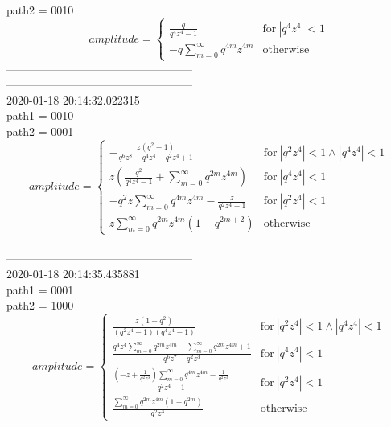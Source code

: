 \documentclass{jsreport}
\begin{document}
path2 = 0010\\
$$amplitude = \begin{cases} \frac{q}{q^{4} z^{4} - 1} & \text{for}\: \left|{q^{4} z^{4}}\right| < 1 \\- q \sum_{m=0}^{\infty} q^{4 m} z^{4 m} & \text{otherwise} \end{cases}$$
--------------------------------------------------\\
--------------------------------------------------\\
2020-01-18 20:14:32.022315\\
path1 = 0010\\
path2 = 0001\\
$$amplitude = \begin{cases} - \frac{z \left(q^{2} - 1\right)}{q^{6} z^{8} - q^{4} z^{4} - q^{2} z^{4} + 1} & \text{for}\: \left|{q^{2} z^{4}}\right| < 1 \wedge \left|{q^{4} z^{4}}\right| < 1 \\z \left(\frac{q^{2}}{q^{4} z^{4} - 1} + \sum_{m=0}^{\infty} q^{2 m} z^{4 m}\right) & \text{for}\: \left|{q^{4} z^{4}}\right| < 1 \\- q^{2} z \sum_{m=0}^{\infty} q^{4 m} z^{4 m} - \frac{z}{q^{2} z^{4} - 1} & \text{for}\: \left|{q^{2} z^{4}}\right| < 1 \\z \sum_{m=0}^{\infty} q^{2 m} z^{4 m} \left(1 - q^{2 m + 2}\right) & \text{otherwise} \end{cases}$$
--------------------------------------------------\\
--------------------------------------------------\\
2020-01-18 20:14:35.435881\\
path1 = 0001\\
path2 = 1000\\
$$amplitude = \begin{cases} \frac{z \left(1 - q^{2}\right)}{\left(q^{2} z^{4} - 1\right) \left(q^{4} z^{4} - 1\right)} & \text{for}\: \left|{q^{2} z^{4}}\right| < 1 \wedge \left|{q^{4} z^{4}}\right| < 1 \\\frac{q^{4} z^{4} \sum_{m=0}^{\infty} q^{2 m} z^{4 m} - \sum_{m=0}^{\infty} q^{2 m} z^{4 m} + 1}{q^{6} z^{7} - q^{2} z^{3}} & \text{for}\: \left|{q^{4} z^{4}}\right| < 1 \\\frac{\left(- z + \frac{1}{q^{2} z^{3}}\right) \sum_{m=0}^{\infty} q^{4 m} z^{4 m} - \frac{1}{q^{2} z^{3}}}{q^{2} z^{4} - 1} & \text{for}\: \left|{q^{2} z^{4}}\right| < 1 \\\frac{\sum_{m=0}^{\infty} q^{2 m} z^{4 m} \left(1 - q^{2 m}\right)}{q^{2} z^{3}} & \text{otherwise} \end{cases}$$
\end{document}
